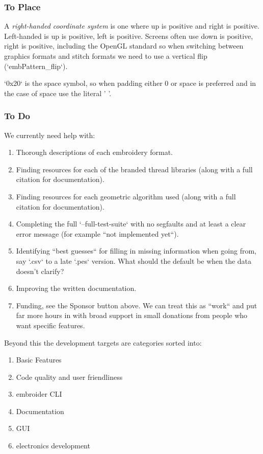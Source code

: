 \documentclass[a4paper, 11pt]{report}
\begin{document}
\subsubsection{To Place}

A \emph{right-handed coordinate system} is one where up is positive and right is
positive. Left-handed is up is positive, left is positive. Screens often use
down is positive, right is positive, including the OpenGL standard so when
switching between graphics formats and stitch formats we need to use a vertical
flip (`embPattern\_flip`).

`0x20` is the space symbol, so when padding either 0 or space is preferred and in the case of space use the literal ' '.

\subsubsection{To Do}

We currently need help with:

\begin{enumerate}
\item Thorough descriptions of each embroidery format.
\item Finding resources for each of the branded thread libraries (along with a full citation for documentation).
\item Finding resources for each geometric algorithm used (along with a full citation for documentation).
\item Completing the full `--full-test-suite`  with no segfaults and at least a clear error message (for example ``not implemented yet``).
\item Identifying ``best guesses`` for filling in missing information when going from, say `.csv` to a late `.pes` version. What should the default be when the data doesn't clarify?
\item Improving the written documentation.
\item Funding, see the Sponsor button above. We can treat this as ``work`` and put far more hours in with broad support in small donations from people who want specific features.
\end{enumerate}

Beyond this the development targets are categories sorted into:

\begin{enumerate}
\item Basic Features
\item Code quality and user friendliness
\item embroider CLI
\item Documentation
\item GUI
\item electronics development
\end{enumerate}
\end{document}
